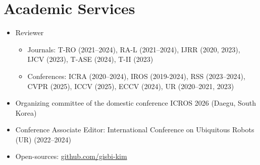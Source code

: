 \section{Academic Services}

\begin{itemize}[label=$\cdot$]

\item Reviewer
\vspace{-2mm}
    \begin{itemize}[label=$\cdot$]
    \item Journals:  T-RO (2021--2024), RA-L (2021--2024), IJRR (2020, 2023), IJCV (2023), T-ASE (2024), T-II (2023)
    \vspace{-2mm}
    \item Conferences: ICRA (2020--2024), IROS (2019-2024), RSS (2023--2024), CVPR (2025), ICCV (2025), ECCV (2024), UR (2020--2021, 2023)
    \end{itemize}
\vspace{-1mm}

\item Organizing committee of the domestic conference ICROS 2026 (Daegu, South Korea)
\vspace{-1mm}

\item Conference Associate Editor: International Conference on Ubiquitous Robots (UR) (2022--2024) 
\vspace{-1mm}

\item Open-sources: \href{https://github.com/gisbi-kim}{github.com/gisbi-kim}
\vspace{-1mm}

\end{itemize}
